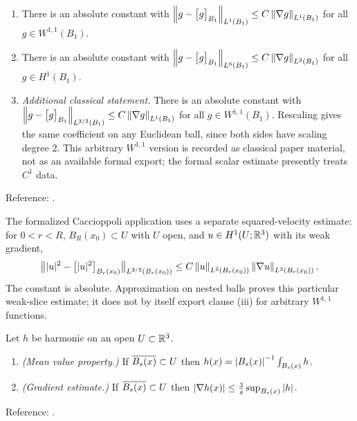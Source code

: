 \documentclass[11pt,reqno]{amsart}
\begin{document}
\begin{externalinput}\label{ext:poincare}\leavevmode
\begin{enumerate}
\item[(i)] There is an absolute constant with
  $\left\lVert g-\bigl[g\bigr]_{B_{1}} \right\rVert_{L^{1}(B_{1})}\le C\left\lVert \nabla g \right\rVert_{L^{1}(B_{1})}$
  for all $g\in W^{1,1}(B_{1})$.
\item[(ii)] There is an absolute constant with
  $\left\lVert g-\bigl[g\bigr]_{B_{1}} \right\rVert_{L^{6}(B_{1})}\le C\left\lVert \nabla g \right\rVert_{L^{2}(B_{1})}$
  for all $g\in H^{1}(B_{1})$.
\item[(iii)] \emph{Additional classical statement.} There is an absolute constant with
  $\left\lVert g-\bigl[g\bigr]_{B_1} \right\rVert_{L^{3/2}(B_1)}
          \le C\left\lVert \nabla g \right\rVert_{L^1(B_1)}$
  for all $g\in W^{1,1}(B_1)$. Rescaling gives the same coefficient on
  any Euclidean ball, since both sides have scaling degree $2$.
  This arbitrary $W^{1,1}$ version is recorded as classical paper material,
  not as an available formal export; the formal scalar estimate presently
  treats $C^1$ data.
\end{enumerate}
Reference: \cite[Ch.~7]{GilbargTrudinger2001}.
\end{externalinput}

The formalized Caccioppoli application uses a separate squared-velocity
estimate: for $0<r<R$, $B_R(x_0)\subset U$ with $U$ open, and
$u\in H^1(U;\mathbb{R}^3)$ with its weak gradient,
\[
 \bigl\||u|^2-\bigl[|u|^2\bigr]_{B_r(x_0)}\bigr\|_{L^{3/2}(B_r(x_0))}
 \le C\left\lVert u \right\rVert_{L^2(B_r(x_0))}\left\lVert \nabla u \right\rVert_{L^2(B_r(x_0))}.
\]
The constant is absolute. Approximation on nested balls proves this
particular weak-slice estimate; it does not by itself export clause (iii)
for arbitrary $W^{1,1}$ functions.

\begin{externalinput}\label{ext:harmonic}
Let $h$ be harmonic on an open $U\subset\mathbb{R}^{3}$.
\begin{enumerate}
\item[(i)] \emph{(Mean value property.)} If $\overline{B_{s}(x)}\subset U$
  then $h(x)=\left\lvert B_{s}(x) \right\rvert^{-1}\int_{B_{s}(x)}h$.
\item[(ii)] \emph{(Gradient estimate.)} If $\overline{B_{s}(x)}\subset U$
  then $\left\lvert \nabla h(x) \right\rvert\le\tfrac3s\sup_{B_{s}(x)}\left\lvert h \right\rvert$.
\end{enumerate}
Reference: \cite[Ch.~2]{GilbargTrudinger2001}.
\end{externalinput}
\end{document}

